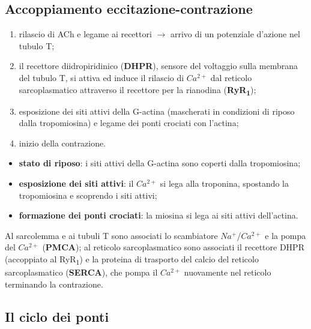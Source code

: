 \subsection{Accoppiamento eccitazione-contrazione}

\begin{enumerate}
  \item rilascio di ACh e legame ai recettori $\rightarrow$ arrivo di un potenziale d'azione nel tubulo T;
  \item il recettore diidropiridinico (\textbf{DHPR}), sensore del voltaggio sulla membrana del tubulo T, si attiva ed induce il rilascio di $Ca^{2+}$ dal reticolo sarcoplasmatico attraverso il recettore per la rianodina (\textbf{RyR\textsubscript{1}});
  \item esposizione dei siti attivi della G-actina (mascherati in condizioni di riposo dalla tropomiosina) e legame dei ponti crociati con l'actina;
  \item inizio della contrazione.
\end{enumerate}

\begin{itemize}
  \item \textbf{stato di riposo}: i siti attivi della G-actina sono coperti dalla tropomiosina;
  \item \textbf{esposizione dei siti attivi}: il $Ca^{2+}$ si lega alla troponina, spostando la tropomiosina e scoprendo i siti attivi;
  \item \textbf{formazione dei ponti crociati}: la miosina si lega ai siti attivi dell'actina.
\end{itemize}

Al sarcolemma e ai tubuli T sono associati lo scambiatore $Na^+$/$Ca^{2+}$ e la pompa del $Ca^{2+}$ (\textbf{PMCA}); al reticolo sarcoplasmatico sono associati il recettore DHPR (accoppiato al RyR\textsubscript{1}) e la proteina di trasporto del calcio del reticolo sarcoplasmatico (\textbf{SERCA}), che pompa il $Ca^{2+}$ nuovamente nel reticolo terminando la contrazione.

\subsection{Il ciclo dei ponti}

